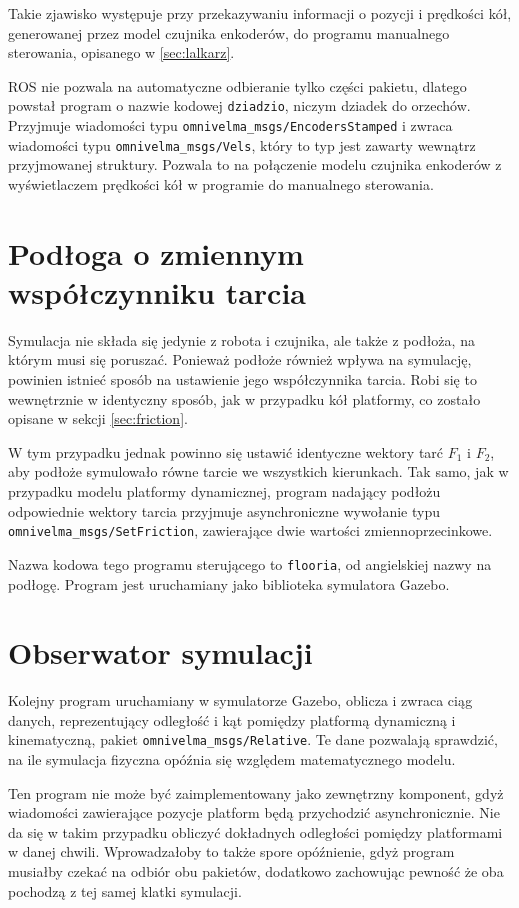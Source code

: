 	Takie zjawisko występuje przy przekazywaniu informacji o pozycji i prędkości kół, generowanej przez model czujnika enkoderów, do programu
	manualnego sterowania, opisanego w \ref{sec:lalkarz}.
	
	ROS nie pozwala na automatyczne odbieranie tylko części pakietu, dlatego powstał program o nazwie kodowej \texttt{dziadzio}, niczym dziadek do orzechów.
	Przyjmuje wiadomości typu \texttt{omnivelma\_msgs/EncodersStamped} i zwraca wiadomości typu \texttt{omnivelma\_msgs/Vels}, który to typ 
	jest zawarty wewnątrz przyjmowanej struktury. Pozwala to na połączenie modelu czujnika enkoderów z wyświetlaczem prędkości kół w programie do manualnego sterowania.

\section{Podłoga o zmiennym współczynniku tarcia}
	\label{sec:flooria}
	Symulacja nie składa się jedynie z robota i czujnika, ale także z podłoża, na którym musi się poruszać.
	Ponieważ podłoże również wpływa na symulację, powinien istnieć sposób na ustawienie jego współczynnika tarcia.
	Robi się to wewnętrznie w identyczny sposób, jak w przypadku kół platformy, co zostało opisane w sekcji \ref{sec:friction}.
	
	W tym przypadku jednak powinno się ustawić identyczne wektory tarć $F_1$ i $F_2$, aby podłoże symulowało równe tarcie we wszystkich kierunkach.
	Tak samo, jak w przypadku modelu platformy dynamicznej, program nadający podłożu odpowiednie wektory tarcia przyjmuje asynchroniczne wywołanie 
	typu \texttt{omnivelma\_msgs/SetFriction}, zawierające dwie wartości zmiennoprzecinkowe.
	
	Nazwa kodowa tego programu sterującego to \texttt{flooria}, od angielskiej nazwy na podłogę.
	Program jest uruchamiany jako biblioteka symulatora Gazebo.
	
\section{Obserwator symulacji}
	\label{sec:ocznica}
	Kolejny program uruchamiany w symulatorze Gazebo, oblicza i zwraca ciąg danych, reprezentujący 
	odległość i kąt pomiędzy platformą dynamiczną i kinematyczną, pakiet \texttt{omnivelma\_msgs/Relative}.
	Te dane pozwalają sprawdzić, na ile symulacja fizyczna opóźnia się względem matematycznego modelu.
	
	Ten program nie może być zaimplementowany jako zewnętrzny komponent, gdyż wiadomości zawierające pozycje platform będą przychodzić asynchronicznie.
	Nie da się w takim przypadku obliczyć dokładnych odległości pomiędzy platformami w danej chwili. 
	Wprowadzałoby to także spore opóźnienie, gdyż program musiałby czekać na odbiór obu pakietów, dodatkowo zachowując pewność że oba pochodzą z tej samej klatki symulacji.
	
